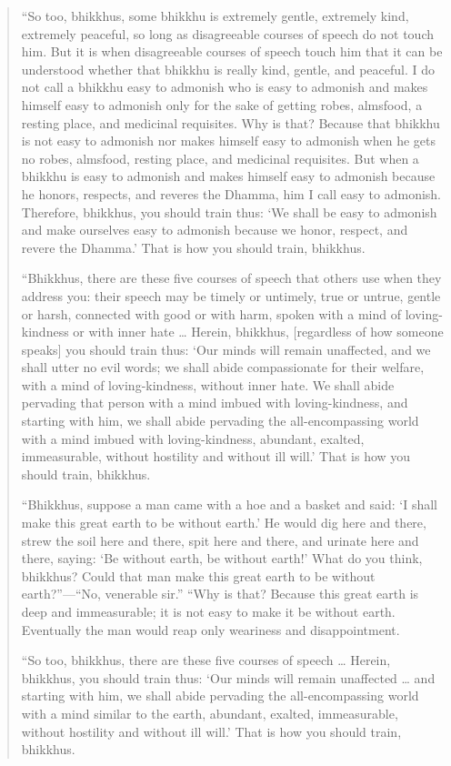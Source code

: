 \begin{quotation}
“So too, bhikkhus, some bhikkhu is extremely gentle, extremely kind,
extremely peaceful, so long as disagreeable courses of speech do not
touch him. But it is when disagreeable courses of speech touch him that
it can be understood whether that bhikkhu is really kind, gentle, and
peaceful. I do not call a bhikkhu easy to admonish who is easy to
admonish and makes himself easy to admonish only for the sake of getting
robes, almsfood, a resting place, and medicinal requisites. Why is that?
Because that bhikkhu is not easy to admonish nor makes himself easy to
admonish when he gets no robes, almsfood, resting place, and medicinal
requisites. But when a bhikkhu is easy to admonish and makes himself
easy to admonish because he honors, respects, and reveres the Dhamma,
him I call easy to admonish. Therefore, bhikkhus, you should train thus:
‘We shall be easy to admonish and make ourselves easy to admonish
because we honor, respect, and revere the Dhamma.’ That is how you
should train, bhikkhus.

“Bhikkhus, there are these five courses of speech that others use when
they address you: their speech may be timely or untimely, true or
untrue, gentle or harsh, connected with good or with harm, spoken with a
mind of loving-kindness or with inner hate \ldots{} Herein, bhikkhus,
{[}regardless of how someone speaks{]} you should train thus: ‘Our minds
will remain unaffected, and we shall utter no evil words; we shall abide
compassionate for their welfare, with a mind of loving-kindness, without
inner hate. We shall abide pervading that person with a mind imbued with
loving-kindness, and starting with him, we shall abide pervading the
all-encompassing world with a mind imbued with loving-kindness,
abundant, exalted, immeasurable, without hostility and without ill
will.’ That is how you should train, bhikkhus.

“Bhikkhus, suppose a man came with a hoe and a basket and said: ‘I shall
make this great earth to be without earth.’ He would dig here and there,
strew the soil here and there, spit here and there, and urinate here and
there, saying: ‘Be without earth, be without earth!’ What do you think,
bhikkhus? Could that man make this great earth to be without
earth?”—“No, venerable sir.” “Why is that? Because this great earth is
deep and immeasurable; it is not easy to make it be without earth.
Eventually the man would reap only weariness and disappointment.

“So too, bhikkhus, there are these five courses of speech \ldots{} Herein,
bhikkhus, you should train thus: ‘Our minds will remain unaffected \ldots{}
and starting with him, we shall abide pervading the all-encompassing
world with a mind similar to the earth, abundant, exalted, immeasurable,
without hostility and without ill will.’ That is how you should train,
bhikkhus.


\end{quotation}
